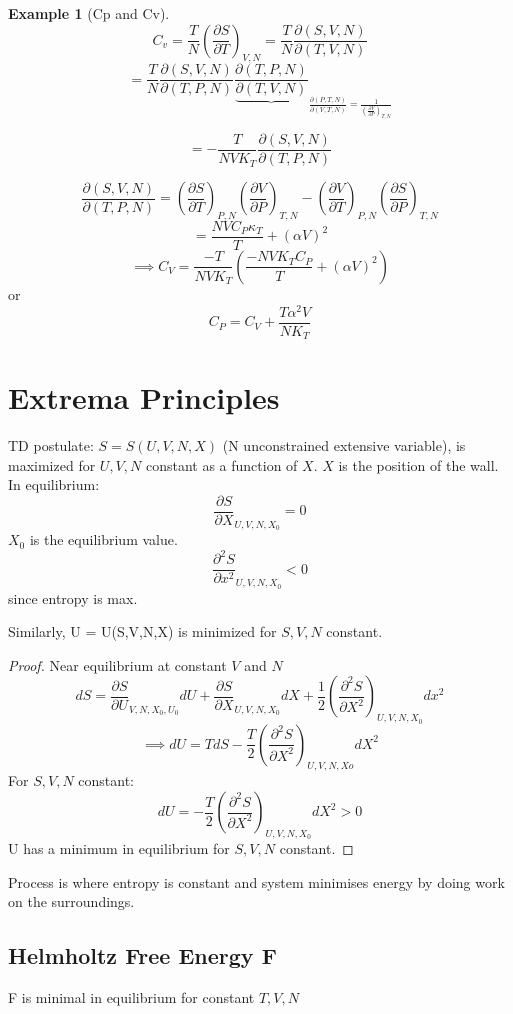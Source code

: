 \documentclass[11pt]{book}
\theoremstyle{definition}
\newtheorem{exm}{Example}[section]
\begin{document}
\begin{exm}[Cp and Cv]
	\[ C_v = \frac{T}{N} \left( \frac{\partial S}{\partial T} \right)_{V,N} = \frac{T}{N} \frac{\partial (S,V,N)}{\partial (T,V,N)}  \] 
	\[ = \frac{T}{N} \frac{\partial (S,V,N)}{\partial (T,P,N)} \frac{\partial (T,P,N)}{\underbrace{\partial (T,V,N)}}_{ \frac{\partial (P,T,N)}{\partial (V,T,N)}  = \frac{1}{\left( \frac{\partial V}{\partial P} \right)_{T,N} }} \] 

	\[ = -\frac{T}{NVK_T} \frac{\partial (S,V,N)}{\partial (T,P,N)}  \] 

	\[ \frac{\partial (S,V,N)}{\partial (T,P,N)} = \left( \frac{\partial S}{\partial T} \right)_{P,N} \left( \frac{\partial V}{\partial P} \right)_{T,N} - \left( \frac{\partial V}{\partial T} \right) _{P,N} \left( \frac{\partial S}{\partial P} \right)_{T,N}    \] 
	\[  = \frac{NVC_P\kappa_T}{T} + (\alpha V)^2 \] 
	\[ \implies C_V = \frac{-T}{NVK_T} \left( \frac{-NVK_T C_P}{T} + (\alpha V)^2 \right)  \] 
	or
	\[ C_P = C_V + \frac{T \alpha ^2V}{NK_T} \] 
	
\end{exm}

\section{Extrema Principles}
TD postulate: $ S =S(U,V,N,X) $ (N unconstrained extensive variable), is maximized for $ U,V,N $ constant as a function of $ X $. $ X $ is the position of the wall.
In equilibrium: 
\[ \frac{\partial S}{\partial X}_{U,V,N,X_0} = 0 \] $ X_0 $ is the equilibrium value.
\[ \frac{\partial ^2 S}{\partial x^2}_{U,V,N,X_0} < 0\] since entropy is max.

Similarly, U = U(S,V,N,X) is minimized for $ S,V,N $ constant.
\begin{proof}
	Near equilibrium at constant $ V $ and $ N $
	\[ dS = \frac{\partial S}{\partial U}_{V,N,X_0,U_0} dU + \frac{\partial S}{\partial X}_{U,V,N,X_0} dX  + \frac{1}{2} \left( \frac{\partial ^2S}{\partial X^2} \right)_{U,V,N,X_0} dx^2 \]
	\[ \implies dU  = TdS - \frac{T}{2} \left( \frac{\partial ^2S}{\partial X^2} \right)_{U,V,N,Xo} dX^2  \] 
	For $ S,V,N $  constant:
	\[ dU = - \frac{T}{2}  \left( \frac{\partial ^2S}{\partial X^2} \right)_{U,V,N,X_0} dX^2 > 0\] 
	U has a minimum in equilibrium for $ S,V,N $ constant.
\end{proof}
 Process is where entropy is constant and system minimises energy by doing work on the surroundings.

 \subsection{Helmholtz Free Energy F}
 F is minimal in equilibrium for constant $ T,V,N$ 
\end{document}
